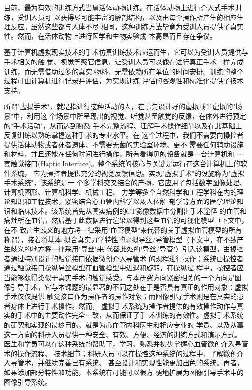 目前，最为有效的训练方式当属活体动物训练。在活体动物上进行介入式手术训练，受训人员可
以获得尽可能丰富的解剖结构，以及由每个操作所产生的相应生理反应。虽然这些都与人体不尽
相同，这种训练方法毕竟为受训人员提供了真实性。然而，在活体动物上进行医学和生物实验成
本高昂而且存在争议。

基于计算机虚拟现实技术的手术仿真训练技术应运而生，它可以为受训人员提供与手术相关的触
觉、视觉等感官信息，让受训人员可以像在进行真正手术一样完成训练，而无需借助过多的真实
物料、无需依赖所在单位的时间安排。训练的整个过程可由计算机进行记录并评估，为实现训练
评估的客观性和标准化提供了技术支持。


所谓"虚拟手术"，就是指进行这种活动的人，在事先设计好的虚拟或半虚拟的"场景"中，利用这
个场景中所呈现出的视觉、听觉甚至触觉的反馈，在体外进行预定的"手术活动"，从而达到熟悉
手术完整流程、理解手术操作细节以及在此基础上反复训练以熟练掌握这种手术的专业水平。在
这个过程中，我们不需要向操控者提供活体动物或者死者遗体、不需要无菌的实验室环境、更不
需要任何辅助设施和材料，并且还能在任何时间进行操作，所有看得见的设备就是一台计算机和
一套触觉接口(Haptic Interface)。整个系统的核心与关键是运行在这台计算机上的软件系统，
它为操控者提供充分的视觉反馈信息。实现"虚拟手术"的设施称为"虚拟手术系统"，该系统是一
个多学科交叉结合的产物，它应用了包括数字图像处理、计算机图形、计算机科学、机械工程、
力学等多个自然科学和工程学科在内的理论知识和工程技术，紧密结合心血管内科学以及人体解
剖学等方面的医学理论知识和临床技术。该系统首先从真实病例的CT影像数据中分割出手术途径
的血管和病灶所在血管，然后基于此数据进行渲染以得到这些血管的可视化模型（下文中，在不
致产生歧义的地方将一律采用"血管模型"来代替的关于虚拟血管模型的所有称谓），接着将基本
拟合真实力学特性的虚拟导丝/导管模型（下文中，在不致产生歧义的地方将一律采用"导丝"来
代替此处的"导丝/导管"）引入该模型，由操控者通过特别设计的触觉接口依据微创介入导管术
的规程进行操作；系统由操控者通过触觉接口操纵导丝模型在血管模型中进退和旋转，在操纵过
程中，操控者应当能够获得类似于真实手术的触觉感受。与本研究方向紧密相关的一个方向是图
像引导手术，它与本课题的最显著的不同之处在于是否具有真正的作用对象：虚拟手术仅仅提供
触觉接口作为操作者的操作对象；而图像引导手术则是在真实的患者身体上进行手术操作。然而，
虚拟手术系统为操作者提供的有效操作动作与真实的手术中的主要动作完全一致，从而保证了手
术训练的有效性。虚拟手术系统的研究和实现的最终目的，就是为心血管内科医生和相应专业的
学员、以及从事这一方向的科研人员提供一种安全、有效、方便、经济的训练方式和演示方式。
医生和学员可以在这种系统的帮助下，学习、熟悉并初步掌握心血管微创介入导管术的操作流程、
技术细节；科研人员可以在操控这种系统的过程中，了解微创介入导管术，并继续完善已有系统、
甚至设计和实现性能更加出色的系统。再者，如果添加部分特性和功能，本系统有可能可以很方
便地扩展为图像引导手术中的图像引导系统。


